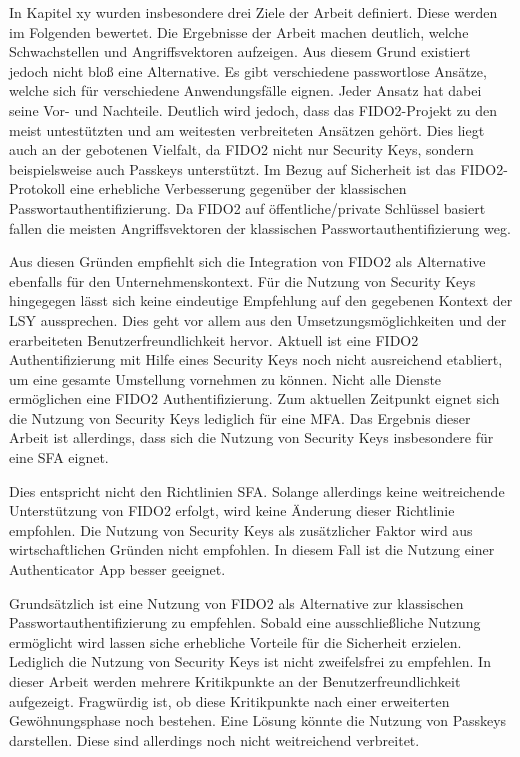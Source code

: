 In Kapitel xy wurden insbesondere drei Ziele der Arbeit definiert. Diese werden im Folgenden bewertet. 
Die Ergebnisse der Arbeit machen deutlich, welche Schwachstellen und Angriffsvektoren aufzeigen. Aus diesem Grund existiert jedoch nicht bloß eine Alternative. Es gibt verschiedene passwortlose Ansätze, welche sich für verschiedene Anwendungsfälle eignen. Jeder Ansatz hat dabei seine Vor- und Nachteile. Deutlich wird jedoch, dass das FIDO2-Projekt zu den meist untestützten und am weitesten verbreiteten Ansätzen gehört. Dies liegt auch an der gebotenen Vielfalt, da FIDO2 nicht nur Security Keys, sondern beispielsweise auch Passkeys unterstützt.
Im Bezug auf Sicherheit ist das FIDO2-Protokoll eine erhebliche Verbesserung gegenüber der klassischen Passwortauthentifizierung. Da FIDO2 auf öffentliche/private Schlüssel basiert fallen die meisten Angriffsvektoren der klassischen Passwortauthentifizierung weg. 

Aus diesen Gründen empfiehlt sich die Integration von FIDO2 als Alternative ebenfalls für den Unternehmenskontext. Für die Nutzung von Security Keys hingegegen lässt sich keine eindeutige Empfehlung auf den gegebenen Kontext der \ac{LSY} aussprechen. Dies geht vor allem aus den Umsetzungsmöglichkeiten und der erarbeiteten Benutzerfreundlichkeit hervor. Aktuell ist eine FIDO2 Authentifizierung mit Hilfe eines Security Keys noch nicht ausreichend etabliert, um eine gesamte Umstellung vornehmen zu können. Nicht alle Dienste ermöglichen eine FIDO2 Authentifizierung. Zum aktuellen Zeitpunkt eignet sich die Nutzung von Security Keys lediglich für eine \ac{MFA}. Das Ergebnis dieser Arbeit ist allerdings, dass sich die Nutzung von Security Keys insbesondere für eine \ac{SFA} eignet.

Dies entspricht nicht den Richtlinien \ac{SFA}. Solange allerdings keine weitreichende Unterstützung von FIDO2 erfolgt, wird keine Änderung dieser Richtlinie empfohlen. Die Nutzung von Security Keys als zusätzlicher Faktor wird aus wirtschaftlichen Gründen nicht empfohlen. In diesem Fall ist die Nutzung einer Authenticator App besser geeignet.

Grundsätzlich ist eine Nutzung von FIDO2 als Alternative zur klassischen Passwortauthentifizierung zu empfehlen. Sobald eine ausschließliche Nutzung ermöglicht wird lassen siche erhebliche Vorteile für die Sicherheit erzielen. Lediglich die Nutzung von Security Keys ist nicht zweifelsfrei zu empfehlen. In dieser Arbeit werden mehrere Kritikpunkte an der Benutzerfreundlichkeit aufgezeigt. Fragwürdig ist, ob diese Kritikpunkte nach einer erweiterten Gewöhnungsphase noch bestehen. Eine Lösung könnte die Nutzung von Passkeys darstellen. Diese sind allerdings noch nicht weitreichend verbreitet.


